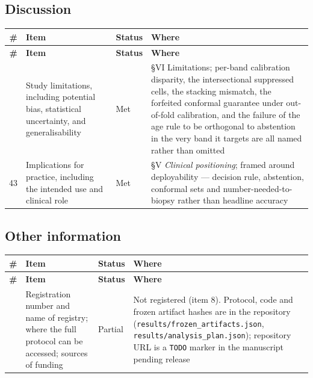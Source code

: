 \subsection*{Discussion}


\begin{longtable}{@{}rp{}lp{}@{}}
\toprule
\textbf{\#} & \textbf{Item} & \textbf{Status} & \textbf{Where} \\
\midrule
\endfirsthead
\toprule
\textbf{\#} & \textbf{Item} & \textbf{Status} & \textbf{Where} \\
\midrule
\endhead
\bottomrule
\endfoot
42 & Study limitations, including potential bias, statistical uncertainty, and generalisability & Met & \S{}VI Limitations; per-band calibration disparity, the intersectional suppressed cells, the stacking mismatch, the forfeited conformal guarantee under out-of-fold calibration, and the failure of the age rule to be orthogonal to abstention in the very band it targets are all named rather than omitted \\
43 & Implications for practice, including the intended use and clinical role & Met & \S{}V \emph{Clinical positioning}; framed around deployability --- decision rule, abstention, conformal sets and number-needed-to-biopsy rather than headline accuracy \\
\end{longtable}


\subsection*{Other information}


\begin{longtable}{@{}rp{}lp{}@{}}
\toprule
\textbf{\#} & \textbf{Item} & \textbf{Status} & \textbf{Where} \\
\midrule
\endfirsthead
\toprule
\textbf{\#} & \textbf{Item} & \textbf{Status} & \textbf{Where} \\
\midrule
\endhead
\bottomrule
\endfoot
44 & Registration number and name of registry; where the full protocol can be accessed; sources of funding & Partial & Not registered (item 8). Protocol, code and frozen artifact hashes are in the repository (\texttt{results/frozen\_artifacts.json}, \texttt{results/analysis\_plan.json}); repository URL is a \texttt{TODO} marker in the manuscript pending release \\
\end{longtable}



